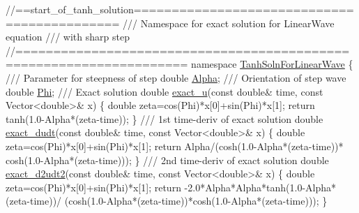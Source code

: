  
\begin{DoxyCodeInclude}
\textcolor{comment}{//==start\_of\_tanh\_solution============================================}
\textcolor{comment}{/// Namespace for exact solution for LinearWave equation }
\textcolor{comment}{}\textcolor{comment}{/// with sharp step }
\textcolor{comment}{}\textcolor{comment}{//====================================================================}
\textcolor{keyword}{namespace }\hyperlink{namespaceTanhSolnForLinearWave}{TanhSolnForLinearWave}
\{
\textcolor{comment}{}
\textcolor{comment}{ /// Parameter for steepness of step}
\textcolor{comment}{} \textcolor{keywordtype}{double} \hyperlink{namespaceTanhSolnForLinearWave_a48021142056bdea20e6432e360fd0314}{Alpha};
\textcolor{comment}{}
\textcolor{comment}{ /// Orientation of step wave}
\textcolor{comment}{} \textcolor{keywordtype}{double} \hyperlink{namespaceTanhSolnForLinearWave_a5242d421b567b803323bc127081351a6}{Phi};
\textcolor{comment}{}
\textcolor{comment}{ /// Exact solution}
\textcolor{comment}{} \textcolor{keywordtype}{double} \hyperlink{namespaceTanhSolnForLinearWave_aceea2935b2d3815ce72aae8c9de2b468}{exact\_u}(\textcolor{keyword}{const} \textcolor{keywordtype}{double}& time, \textcolor{keyword}{const} Vector<double>& x)
 \{
  \textcolor{keywordtype}{double} zeta=cos(Phi)*x[0]+sin(Phi)*x[1];
  \textcolor{keywordflow}{return} tanh(1.0-Alpha*(zeta-time));
 \}
 \textcolor{comment}{}
\textcolor{comment}{ /// 1st time-deriv of exact solution}
\textcolor{comment}{} \textcolor{keywordtype}{double} \hyperlink{namespaceTanhSolnForLinearWave_aa2081bd3d3d518a38497f664b0e498bc}{exact\_dudt}(\textcolor{keyword}{const} \textcolor{keywordtype}{double}& time, \textcolor{keyword}{const} Vector<double>& x)
 \{
  \textcolor{keywordtype}{double} zeta=cos(Phi)*x[0]+sin(Phi)*x[1];
  \textcolor{keywordflow}{return} Alpha/(cosh(1.0-Alpha*(zeta-time))*
              cosh(1.0-Alpha*(zeta-time)));
 \}
\textcolor{comment}{}
\textcolor{comment}{ /// 2nd time-deriv of exact solution}
\textcolor{comment}{} \textcolor{keywordtype}{double} \hyperlink{namespaceTanhSolnForLinearWave_a63b7a0f5fd5d06cc2c0a43322a81fe43}{exact\_d2udt2}(\textcolor{keyword}{const} \textcolor{keywordtype}{double}& time, \textcolor{keyword}{const} Vector<double>& x)
 \{
  \textcolor{keywordtype}{double} zeta=cos(Phi)*x[0]+sin(Phi)*x[1];
  \textcolor{keywordflow}{return} -2.0*Alpha*Alpha*tanh(1.0-Alpha*(zeta-time))/
   (cosh(1.0-Alpha*(zeta-time))*cosh(1.0-Alpha*(zeta-time)));
 \}


\end{DoxyCodeInclude}
